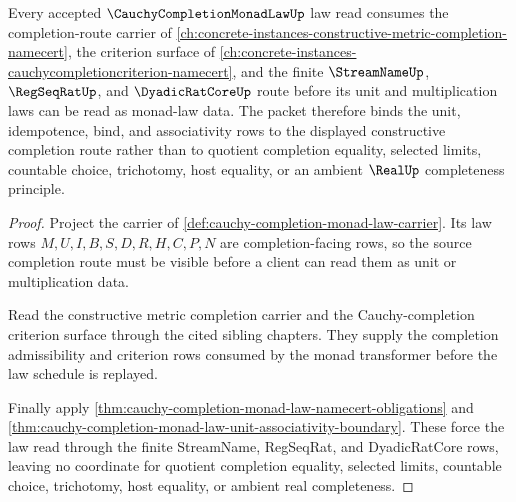 \begin{lemma}
\label{lem:cauchy-completion-monad-law-l10-completion-dependency-route}
Every accepted $\CauchyCompletionMonadLawUp$ law read consumes the completion-route carrier of \autoref{ch:concrete-instances-constructive-metric-completion-namecert}, the criterion surface of \autoref{ch:concrete-instances-cauchycompletioncriterion-namecert}, and the finite $\StreamNameUp$, $\RegSeqRatUp$, and $\DyadicRatCoreUp$ route before its unit and multiplication laws can be read as monad-law data. The packet therefore binds the unit, idempotence, bind, and associativity rows to the displayed constructive completion route rather than to quotient completion equality, selected limits, countable choice, trichotomy, host equality, or an ambient $\RealUp$ completeness principle.
\end{lemma}
\begin{proof}
Project the carrier of \autoref{def:cauchy-completion-monad-law-carrier}. Its law rows $M,U,I,B,S,D,R,H,C,P,N$ are completion-facing rows, so the source completion route must be visible before a client can read them as unit or multiplication data.

Read the constructive metric completion carrier and the Cauchy-completion criterion surface through the cited sibling chapters. They supply the completion admissibility and criterion rows consumed by the monad transformer before the law schedule is replayed.

Finally apply \autoref{thm:cauchy-completion-monad-law-namecert-obligations} and \autoref{thm:cauchy-completion-monad-law-unit-associativity-boundary}. These force the law read through the finite StreamName, RegSeqRat, and DyadicRatCore rows, leaving no coordinate for quotient completion equality, selected limits, countable choice, trichotomy, host equality, or ambient real completeness.
\end{proof}
